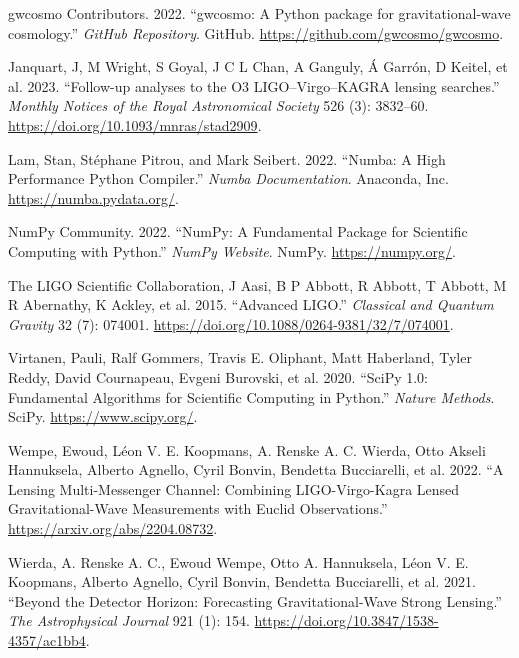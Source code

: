 \documentclass[10pt,a4paper,onecolumn]{article}
\newlength{\cslhangindent}
\newenvironment{CSLReferences}[3] %
 {%
  \setlength{\parindent}{0pt}
  \ifodd #1 \everypar{\setlength{\hangindent}{\cslhangindent}}\ignorespaces\fi
  \ifnum #2 > 0
  \setlength{\parskip}{#2\baselineskip}
  \fi
 }%
 {}
\begin{document}
\begin{CSLReferences}{1}{0}
\bibitem[\citeproctext]{ref-gwcosmo}
gwcosmo Contributors. 2022. {``{gwcosmo: A Python package for
gravitational-wave cosmology}.''} \emph{GitHub Repository}. GitHub.
\url{https://github.com/gwcosmo/gwcosmo}.

Janquart, J, M Wright, S Goyal, J C L Chan, A Ganguly, Á Garrón, D
Keitel, et al. 2023. {``{Follow-up analyses to the O3 LIGO--Virgo--KAGRA
lensing searches}.''} \emph{Monthly Notices of the Royal Astronomical
Society} 526 (3): 3832--60.
\url{https://doi.org/10.1093/mnras/stad2909}.

Lam, Stan, Stéphane Pitrou, and Mark Seibert. 2022. {``Numba: A High
Performance Python Compiler.''} \emph{Numba Documentation}. Anaconda,
Inc. \url{https://numba.pydata.org/}.

NumPy Community. 2022. {``NumPy: A Fundamental Package for Scientific
Computing with Python.''} \emph{NumPy Website}. NumPy.
\url{https://numpy.org/}.

The LIGO Scientific Collaboration, J Aasi, B P Abbott, R Abbott, T
Abbott, M R Abernathy, K Ackley, et al. 2015. {``Advanced LIGO.''}
\emph{Classical and Quantum Gravity} 32 (7): 074001.
\url{https://doi.org/10.1088/0264-9381/32/7/074001}.

Virtanen, Pauli, Ralf Gommers, Travis E. Oliphant, Matt Haberland, Tyler
Reddy, David Cournapeau, Evgeni Burovski, et al. 2020. {``{SciPy 1.0:
Fundamental Algorithms for Scientific Computing in Python}.''}
\emph{Nature Methods}. SciPy. \url{https://www.scipy.org/}.

Wempe, Ewoud, Léon V. E. Koopmans, A. Renske A. C. Wierda, Otto Akseli
Hannuksela, Alberto Agnello, Cyril Bonvin, Bendetta Bucciarelli, et al.
2022. {``A Lensing Multi-Messenger Channel: Combining LIGO-Virgo-Kagra
Lensed Gravitational-Wave Measurements with Euclid Observations.''}
\url{https://arxiv.org/abs/2204.08732}.

Wierda, A. Renske A. C., Ewoud Wempe, Otto A. Hannuksela, Léon V. E.
Koopmans, Alberto Agnello, Cyril Bonvin, Bendetta Bucciarelli, et al.
2021. {``Beyond the Detector Horizon: Forecasting Gravitational-Wave
Strong Lensing.''} \emph{The Astrophysical Journal} 921 (1): 154.
\url{https://doi.org/10.3847/1538-4357/ac1bb4}.

\end{CSLReferences}
\end{document}
